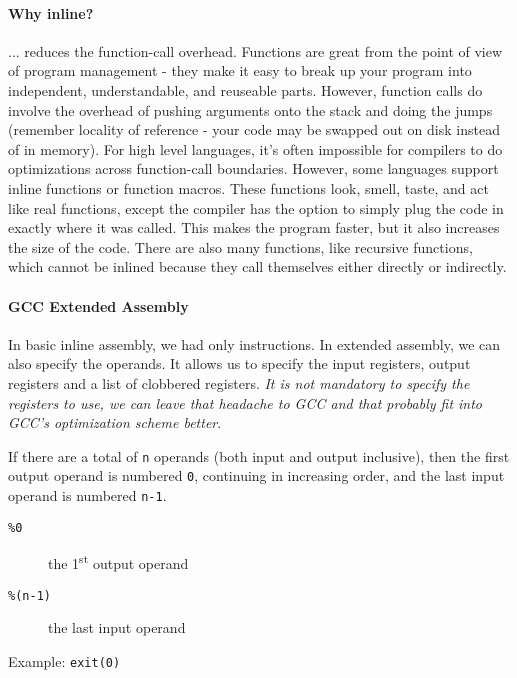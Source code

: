 \paragraph{Why inline?}

... reduces the function-call overhead. Functions are great from the point of view of
program management - they make it easy to break up your program into independent,
understandable, and reuseable parts.  However, function calls do involve the overhead of
pushing arguments onto the stack and doing the jumps (remember locality of reference -
your code may be swapped out on disk instead of in memory).  For high level languages,
it's often impossible for compilers to do optimizations across function-call boundaries.
However, some languages support inline functions or function macros.  These functions
look, smell, taste, and act like real functions, except the compiler has the option to
simply plug the code in exactly where it was called. This makes the program faster, but it
also increases the size of the code. There are also many functions, like recursive
functions, which cannot be inlined because they call themselves either directly or
indirectly. 

\paragraph{GCC Extended Assembly}

In basic inline assembly, we had only instructions. In extended assembly, we can also
specify the operands. It allows us to specify the input registers, output registers and a
list of clobbered registers. \emph{It is not mandatory to specify the registers to use, we
  can leave that headache to GCC and that probably fit into GCC's optimization scheme
  better}.

If there are a total of \texttt{n} operands (both input and output inclusive), then the
first output operand is numbered \texttt{0}, continuing in increasing order, and the last
input operand is numbered \texttt{n-1}. 

\begin{description}
\item[\texttt{\%0}] the 1\textsuperscript{st} output operand
\item[\texttt{\%(n-1)}] the last input operand
\end{description}


\begin{frame}
  \begin{block}{Example: \texttt{exit(0)}}
    \begin{center}
    \end{center}
  \end{block}
\end{frame}

